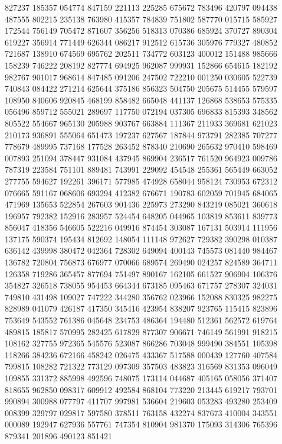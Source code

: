 {827237 185357 054774 847159 221113 225285 675672 783496 420797 094438 487555%
802215 235138 763980 415357 784839 751802 587770 015715 585927 172544 756149%
705472 871607 356256 518313 070386 685924 370727 890304 619227 356914 771449%
626344 086217 912512 615736 305976 779327 480852 721687 138910 674569 695762%
202511 734772 603123 400012 151488 985666 158239 746222 208192 827774 694925%
962087 999931 152866 654615 182192 982767 901017 968614 847485 091206 247502%
722210 001250 030605 522739 740843 084422 271214 625644 375186 856323 504750%
205675 514455 579597 108950 840606 920845 468199 858482 665048 441137 126868%
538653 575335 056496 859712 555021 289697 117750 072194 037305 696833 815393%
348562 805522 554667 965130 205988 903767 663884 111367 211933 369681 621023%
210173 936891 555064 651473 197237 627567 187844 973791 282385 707277 778679%
489995 737168 177528 263452 878340 210690 265632 970410 598469 007893 251094%
378447 931084 437945 869904 236517 761520 964923 009786 787319 223584 751101%
889481 743991 229092 454548 255361 565449 663052 277755 594627 192261 396171%
577985 474928 658044 958124 730953 672312 076665 591167 068606 693294 412382%
676671 190783 602059 701945 684065 471969 135653 522854 267603 901436 225973%
273290 843219 085021 360618 196957 792382 152916 283957 524454 648205 044965%
103819 853611 839773 856047 418356 546605 522216 049916 874454 303087 167131%
503914 111956 137175 590374 195434 812692 148054 111148 972627 729382 390298%
010387 636142 439998 380472 042364 728302 649094 400143 745573 081440 984467%
136782 720804 756873 676977 070066 689574 269490 024257 824589 364711 126358%
719286 365457 877694 751497 890167 162105 661527 906904 106376 354827 326518%
738055 954453 664344 673185 095463 671757 278307 324031 749810 431498 109027%
747222 344280 356762 023966 152088 830325 982275 828989 041079 426187 417350%
345416 423954 838207 923765 115415 823896 753649 543552 761386 045648 234753%
486364 194480 512361 562572 619764 489815 185817 570995 282425 617829 877307%
906671 746149 561991 918215 108162 327755 972365 545576 523087 866286 703048%
999490 384551 105398 118266 384236 672166 458242 026475 433367 517588 000439%
127760 407584 799815 108282 721322 773129 097309 357503 483823 316569 831353%
096049 109855 331372 885998 492596 748075 173114 044687 405165 058056 371407%
818655 962850 098317 609912 492584 868104 773220 213445 619217 793701 990894%
300988 077797 411707 997981 536604 219603 053283 493280 253409 008399 329797%
029817 597580 378511 763158 432274 837673 410004 343551 000089 192947 627936%
557761 747354 810904 981370 175093 314306 765396 879341 201896 490123 851421%
}

